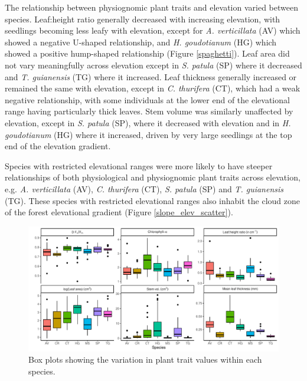 \documentclass[a4paper, 11pt]{article}
\begin{document}
The relationship between physiognomic plant traits and elevation varied between species. Leaf:height ratio generally decreased with increasing elevation, with seedlings becoming less leafy with elevation, except for \textit{A. verticillata} (AV) which showed a negative U-shaped relationship, and \textit{H. goudotianum} (HG) which showed a positive hump-shaped relationship (Figure \ref{spaghetti}). Leaf area did not vary meaningfully across elevation except in \textit{S. patula} (SP) where it decreased and \textit{T. guianensis} (TG) where it increased. Leaf thickness generally increased or remained the same with elevation, except in \textit{C. thurifera} (CT), which had a weak negative relationship, with some individuals at the lower end of the elevational range having particularly thick leaves. Stem volume was similarly unaffected by elevation, except in \textit{S. patula} (SP), where it decreased with elevation and in \textit{H. goudotianum} (HG) where it increased, driven by very large seedlings at the top end of the elevation gradient.

Species with restricted elevational ranges were more likely to have steeper relationships of both physiological and physiognomic plant traits across elevation, e.g. \textit{A. verticillata} (AV), \textit{C. thurifera} (CT), \textit{S. patula} (SP) and \textit{T. guianensis} (TG). These species with restricted elevational ranges also inhabit the cloud zone of the forest elevational gradient (Figure \ref{slope_elev_scatter}).

\begin{figure}[H]
\includegraphics[width=\textwidth]{box}
\centering
\caption{Box plots showing the variation in plant trait values within each species.}
\label{box}
\end{figure}
\end{document}
